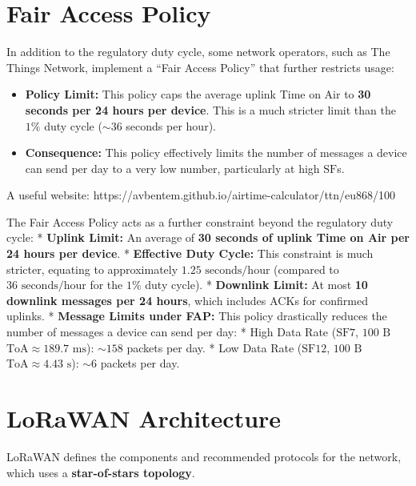\documentclass[a4paper, 12pt]{book} %
\begin{document}
\section{Fair Access Policy}\label{fair-access-policy}

In addition to the regulatory duty cycle, some network operators, such
as The Things Network, implement a ``Fair Access Policy'' that further
restricts usage:

\begin{itemize}
\tightlist
\item
  \textbf{Policy Limit:} This policy caps the average uplink Time on Air
  to \textbf{30 seconds per 24 hours per device}. This is a much
  stricter limit than the \(1\%\) duty cycle (\(\sim 36\) seconds per
  hour).
\item
  \textbf{Consequence:} This policy effectively limits the number of
  messages a device can send per day to a very low number, particularly
  at high \(\text{SF}\)s.
\end{itemize}

A useful website:
https://avbentem.github.io/airtime-calculator/ttn/eu868/100

The Fair Access Policy acts as a further constraint beyond the
regulatory duty cycle: * \textbf{Uplink Limit:} An average of \textbf{30
seconds of uplink Time on Air per 24 hours per device}. *
\textbf{Effective Duty Cycle:} This constraint is much stricter,
equating to approximately \(1.25 \text{ seconds/hour}\) (compared to
\(36 \text{ seconds/hour}\) for the \(1\%\) duty cycle). *
\textbf{Downlink Limit:} At most \textbf{10 downlink messages per 24
hours}, which includes \(\text{ACK}\)s for confirmed uplinks. *
\textbf{Message Limits under FAP:} This policy drastically reduces the
number of messages a device can send per day: * High Data Rate
(\(\text{SF}7\), \(100 \text{ B}\)
\(\text{ToA} \approx 189.7 \text{ ms}\)): \(\sim 158\) packets per day.
* Low Data Rate (\(\text{SF}12\), \(100 \text{ B}\)
\(\text{ToA} \approx 4.43 \text{ s}\)): \(\sim 6\) packets per day.

\section{LoRaWAN Architecture}\label{lorawan-architecture}

LoRaWAN defines the components and recommended protocols for the
network, which uses a \textbf{star-of-stars topology}.
\end{document}
